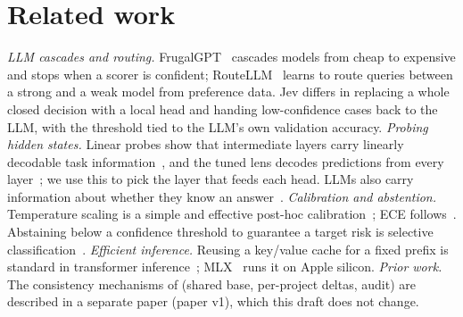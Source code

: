 \section{Related work}\label{sec:related}
\emph{LLM cascades and routing.} FrugalGPT~\cite{frugalgpt} cascades models from cheap to expensive and stops when a scorer is confident; RouteLLM~\cite{routellm} learns to route queries between a strong and a weak model from preference data. Jev differs in replacing a whole closed decision with a local head and handing low-confidence cases back to the LLM, with the threshold tied to the LLM's own validation accuracy.
\emph{Probing hidden states.} Linear probes show that intermediate layers carry linearly decodable task information~\cite{alain2017}, and the tuned lens decodes predictions from every layer~\cite{belrose2023}; we use this to pick the layer that feeds each head. LLMs also carry information about whether they know an answer~\cite{kadavath2022}.
\emph{Calibration and abstention.} Temperature scaling is a simple and effective post-hoc calibration~\cite{guo2017}; ECE follows~\cite{naeini2015}. Abstaining below a confidence threshold to guarantee a target risk is selective classification~\cite{geifman2017}.
\emph{Efficient inference.} Reusing a key/value cache for a fixed prefix is standard in transformer inference~\cite{pope2023}; MLX~\cite{mlx} runs it on Apple silicon.
\emph{Prior \sys{} work.} The consistency mechanisms of \sys{} (shared base, per-project deltas, audit) are described in a separate paper (paper v1), which this draft does not change.
